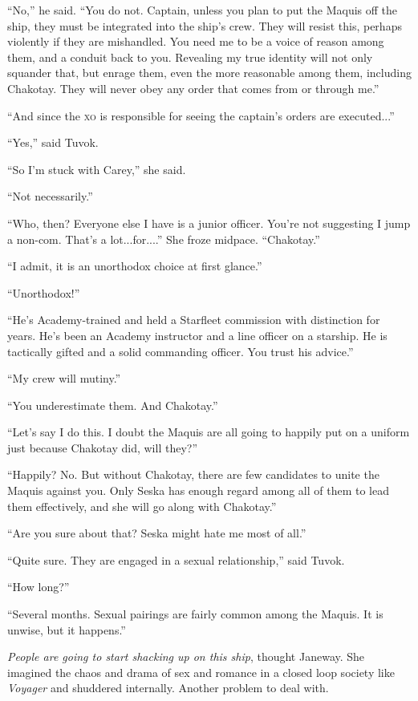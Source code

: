 \documentclass[twoside,letterpaper,12pt]{memoir}
\begin{document}
``No,” he said. ``You do not. Captain, unless you plan to put the Maquis off the ship, they must be integrated into the ship’s crew. They will resist this, perhaps violently if they are mishandled. You need me to be a voice of reason among them, and a conduit back to you. Revealing my true identity will not only squander that, but enrage them, even the more reasonable among them, including Chakotay. They will never obey any order that comes from or through me.” 

``And since the \textsc{xo} is responsible for seeing the captain’s orders are executed...” 

``Yes,” said Tuvok. 

``So I’m stuck with Carey,” she said. 

``Not necessarily.” 

``Who, then? Everyone else I have is a junior officer. You’re not suggesting I jump a non-com. That’s a lot...for....” She froze midpace. ``Chakotay.” 

``I admit, it is an unorthodox choice at first glance.” 

``Unorthodox!” 

``He’s Academy-trained and held a Starfleet commission with distinction for years. He’s been an Academy instructor and a line officer on a starship. He is tactically gifted and a solid commanding officer. You trust his advice.” 

``My crew will mutiny.” 

``You underestimate them. And Chakotay.” 

``Let’s say I do this. I doubt the Maquis are all going to happily put on a uniform just because Chakotay did, will they?” 

``Happily? No. But without Chakotay, there are few candidates to unite the Maquis against you. Only Seska has enough regard among all of them to lead them effectively, and she will go along with Chakotay.” 

``Are you sure about that? Seska might hate me most of all.” 

``Quite sure. They are engaged in a sexual relationship,” said Tuvok. 

``How long?” 

``Several months. Sexual pairings are fairly common among the Maquis. It is unwise, but it happens.” 

\textit{People are going to start shacking up on this ship}, thought Janeway. She imagined the chaos and drama of sex and romance in a closed loop society like \textit{Voyager} and shuddered internally. Another problem to deal with. 
\end{document}
